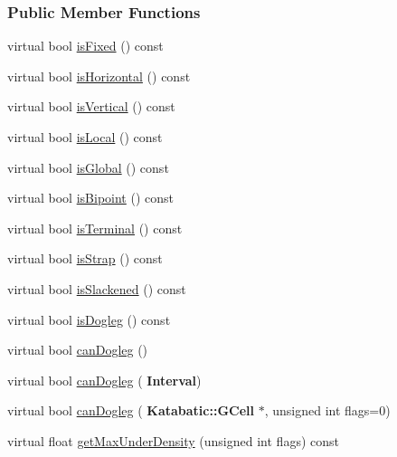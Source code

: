 \subsubsection*{Public Member Functions}
\begin{DoxyCompactItemize}
\item 
virtual bool \mbox{\hyperlink{classKite_1_1TrackSegment_afd7362b850709bed8b61c1aa22399f97}{is\+Fixed}} () const
\item 
virtual bool \mbox{\hyperlink{classKite_1_1TrackSegment_a21b9cefd33ae22e4c2070ad441bdd30b}{is\+Horizontal}} () const
\item 
virtual bool \mbox{\hyperlink{classKite_1_1TrackSegment_abd54544ef1710ee4b67cfb021d73446c}{is\+Vertical}} () const
\item 
virtual bool \mbox{\hyperlink{classKite_1_1TrackSegment_add556a145a89fdbcea82346abfb873dc}{is\+Local}} () const
\item 
virtual bool \mbox{\hyperlink{classKite_1_1TrackSegment_a19ba379112d6b29faa45c5eefbf38500}{is\+Global}} () const
\item 
virtual bool \mbox{\hyperlink{classKite_1_1TrackSegment_a72741158d19af38e84c5e9c08f91270f}{is\+Bipoint}} () const
\item 
virtual bool \mbox{\hyperlink{classKite_1_1TrackSegment_a1e074cb3064037035548e5e6d238e315}{is\+Terminal}} () const
\item 
virtual bool \mbox{\hyperlink{classKite_1_1TrackSegment_a62d61c231cf404a814ae37665fa8164f}{is\+Strap}} () const
\item 
virtual bool \mbox{\hyperlink{classKite_1_1TrackSegment_a782cff57d3fe10e758d19ee65a06643d}{is\+Slackened}} () const
\item 
virtual bool \mbox{\hyperlink{classKite_1_1TrackSegment_a75d91371e5281dd21f60ff39ae70a3e5}{is\+Dogleg}} () const
\item 
virtual bool \mbox{\hyperlink{classKite_1_1TrackSegment_aa0bb6f1592688e942ff67e0ac318a4fd}{can\+Dogleg}} ()
\item 
virtual bool \mbox{\hyperlink{classKite_1_1TrackSegment_accb4c6a7ee2678a0cff4dbc4a7860fe1}{can\+Dogleg}} (\textbf{ Interval})
\item 
virtual bool \mbox{\hyperlink{classKite_1_1TrackSegment_a4f040cf33009e4886d401115c3bea838}{can\+Dogleg}} (\textbf{ Katabatic\+::\+G\+Cell} $\ast$, unsigned int flags=0)
\item 
virtual float \mbox{\hyperlink{classKite_1_1TrackSegment_abb61228ad7b29c19c6428902d34126f7}{get\+Max\+Under\+Density}} (unsigned int flags) const

\end{DoxyCompactItemize}
